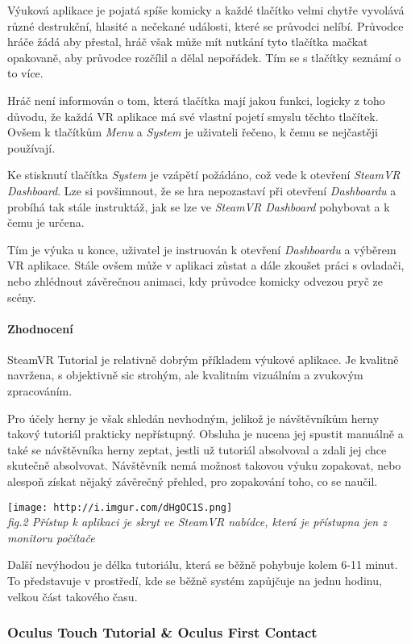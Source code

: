 Výuková aplikace je pojatá spíše komicky a každé tlačítko velmi chytře
vyvolává různé destrukční, hlasité a nečekané události, které se
průvodci nelíbí. Průvodce hráče žádá aby přestal, hráč však může mít
nutkání tyto tlačítka mačkat opakovaně, aby průvodce rozčílil a dělal
nepořádek. Tím se s tlačítky seznámí o to více.

Hráč není informován o tom, která tlačítka mají jakou funkci, logicky z
toho důvodu, že každá VR aplikace má své vlastní pojetí smyslu těchto
tlačítek. Ovšem k tlačítkům \emph{Menu} a \emph{System} je uživateli
řečeno, k čemu se nejčastěji používají.

Ke stisknutí tlačítka \emph{System} je vzápětí požádáno, což vede k
otevření \emph{SteamVR Dashboard}. Lze si povšimnout, že se hra
nepozastaví při otevření \emph{Dashboardu} a probíhá tak stále
instruktáž, jak se lze ve \emph{SteamVR Dashboard} pohybovat a k čemu je
určena.

Tím je výuka u konce, uživatel je instruován k otevření
\emph{Dashboardu} a výběrem VR aplikace. Stále ovšem může v aplikaci
zůstat a dále zkoušet práci s ovladači, nebo zhlédnout závěrečnou
animaci, kdy průvodce komicky odvezou pryč ze scény.

\paragraph{Zhodnocení}\label{zhodnocenuxed}

SteamVR Tutorial je relativně dobrým příkladem výukové aplikace. Je
kvalitně navržena, s objektivně sic strohým, ale kvalitním vizuálním a
zvukovým zpracováním.

Pro účely herny je však shledán nevhodným, jelikož je návštěvníkům herny
takový tutoriál prakticky nepřístupný. Obsluha je nucena jej spustit
manuálně a také se návštěvníka herny zeptat, jestli už tutoriál
absolvoval a zdali jej chce skutečně absolvovat. Návštěvník nemá možnost
takovou výuku zopakovat, nebo alespoň získat nějaký závěrečný přehled,
pro zopakování toho, co se naučil.

\texttt{[image: http://i.imgur.com/dHgOC1S.png]}\\
\emph{fig.2 Přístup k aplikaci je skryt ve SteamVR nabídce, která je
přístupna jen z monitoru počítače}

Další nevýhodou je délka tutoriálu, která se běžně pohybuje kolem 6-11
minut. To představuje v prostředí, kde se běžně systém zapůjčuje na
jednu hodinu, velkou část takového času.

\subsubsection{Oculus Touch Tutorial \& Oculus First
Contact}\label{oculus-touch-tutorial-oculus-first-contact}

